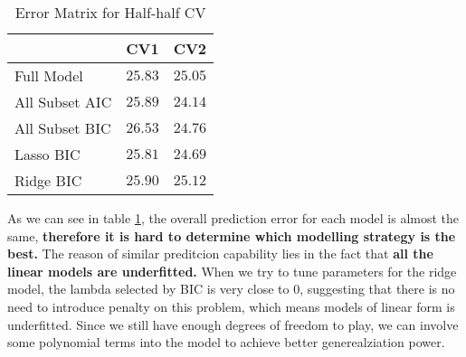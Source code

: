 \documentclass[12pt,oneside,a4paper]{article}\usepackage[]{graphicx}\usepackage[]{xcolor}
\begin{document}
\begin{table}[ht!]
\centering
\caption{Error Matrix for Half-half CV}
\begin{tabular}{lcc}
\toprule
 \multicolumn{1}{c}{  } & \multicolumn{1}{c}{ CV1 } & \multicolumn{1}{c}{ CV2 } \\
\midrule
 Full Model & $25.83$ & $25.05$ \\
 All Subset AIC & $25.89$ & $24.14$ \\
 All Subset BIC & $26.53$ & $24.76$ \\
 Lasso BIC & $25.81$ & $24.69$ \\
 Ridge BIC & $25.90$ & $25.12$ \\
\bottomrule
\end{tabular}
\label{error matrix}
\end{table}

As we can see in table \ref{error matrix}, the overall prediction error for each model is almost the same, \textbf{therefore it is hard to determine which modelling strategy is the best.} The reason of similar preditcion capability lies in the fact that \textbf{all the linear models are underfitted.} When we try to tune parameters for the ridge model, the lambda selected by BIC is very close to 0, suggesting that there is no need to introduce penalty on this problem, which means models of linear form is underfitted. Since we still have enough degrees of freedom to play, we can involve some polynomial terms into the model to achieve better generealziation power.
\end{document}
